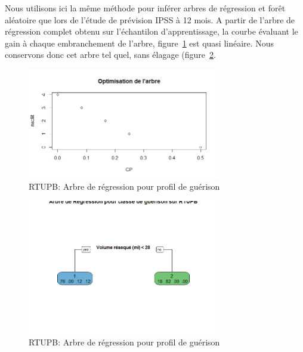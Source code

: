 %
%

%

Nous utilisons ici la même méthode pour inférer arbres de régression et forêt aléatoire que lors de l'étude de prévision IPSS à 12 mois. A partir de l'arbre de régression complet obtenu sur l'échantilon d'apprentissage, la courbe évaluant le gain à chaque embranchement de l'arbre, figure~\ref{fig-rtupb-regtree-optim-healing-class} est quasi linéaire. Nous conservons donc cet arbre tel quel, sans élagage (figure~\ref{fig-rtupb-regtree-healing-class}.

\begin{figure}[H]
\centering
\includegraphics[width=0.75\textwidth]{../Fig/RTUPB/rtupb-regtree-optim-healing-class.png}
\caption{RTUPB: Arbre de régression pour profil de guérison}
\label{fig-rtupb-regtree-optim-healing-class}
\end{figure}

\begin{figure}[H]
\centering
\includegraphics[width=0.75\textwidth]{../Fig/RTUPB/rtupb-regtree-healing-class.png}
\caption{RTUPB: Arbre de régression pour profil de guérison}
\label{fig-rtupb-regtree-healing-class}
\end{figure}


